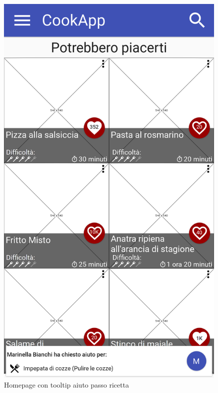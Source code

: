 \begin{figure}[H]
\begin{minipage}{.49\textwidth}
		\includegraphics[width=\textwidth]{img/wireframe/homepage_aiuto_passo_ricetta.png}
		\caption{Homepage con tooltip aiuto passo ricetta}
	\end{minipage}
\end{figure}
